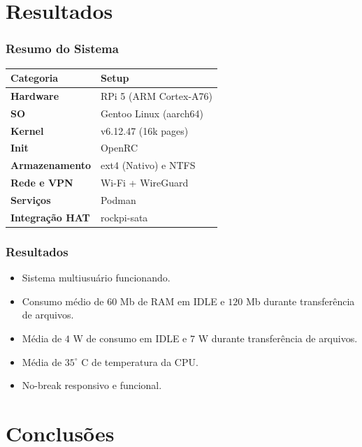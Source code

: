 \documentclass[14pt]{beamer}
\begin{document}
\section{Resultados}


\begin{frame}
\frametitle{Resumo do Sistema}

\centering
\renewcommand{\arraystretch}{1.2}
\begin{table}
    \begin{tabular}{@{}ll@{}}
        \toprule
        \textbf{Categoria} & \textbf{Setup} \\
        \midrule
        \textbf{Hardware} & RPi 5 (ARM Cortex-A76) \\
        \textbf{SO} & Gentoo Linux (aarch64) \\
        \textbf{Kernel} & v6.12.47 (16k pages) \\
        \textbf{Init} & OpenRC \\
        \textbf{Armazenamento} & ext4 (Nativo) e NTFS \\
        \textbf{Rede e VPN} & Wi-Fi + WireGuard \\
        \textbf{Serviços} & Podman \\
        \textbf{Integração HAT} & rockpi-sata \\
        \bottomrule
    \end{tabular}
\end{table}

\end{frame}

\begin{frame}
\frametitle{Resultados}

\begin{itemize}
    \item Sistema multiusuário funcionando.
    \item Consumo médio de $60$ Mb de RAM em IDLE e $120$ Mb durante transferência de arquivos.
    \item Média de $4$ W de consumo em IDLE e $7$ W durante transferência de arquivos.
    \item Média de $35^\circ$ C de temperatura da CPU.
    \item No-break responsivo e funcional.
\end{itemize}

\end{frame}


\section{Conclusões}
\end{document}

